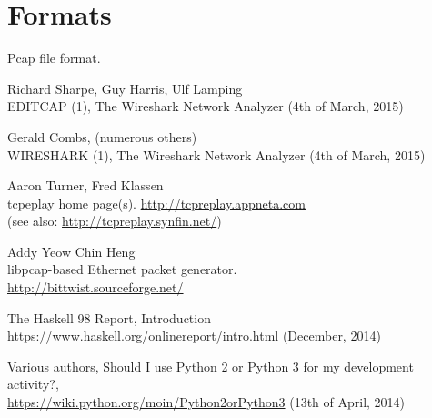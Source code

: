 \documentclass[10pt,a4paper,notitlepage]{report}
\begin{document}
\section{Formats}
Pcap file format.

\begin{thebibliography}{99}
    Richard Sharpe, Guy Harris, Ulf Lamping\\
    EDITCAP (1), The Wireshark Network Analyzer (4th of March, 2015)

    Gerald Combs, (numerous others)\\
    WIRESHARK (1), The Wireshark Network Analyzer (4th of March, 2015)

    Aaron Turner, Fred Klassen\\
    tcpeplay home page(s).
    \url{http://tcpreplay.appneta.com}\\
    (see also: \url{http://tcpreplay.synfin.net/})

    Addy Yeow Chin Heng\\
    libpcap-based Ethernet packet generator.\\
    \url{http://bittwist.sourceforge.net/}

    The Haskell 98 Report, Introduction\\
    \url{https://www.haskell.org/onlinereport/intro.html} (December, 2014)

    Various authors, Should I use Python 2 or Python 3 for my development activity?, \\
    \url{https://wiki.python.org/moin/Python2orPython3} (13th of April, 2014)

\end{thebibliography}
\end{document}
